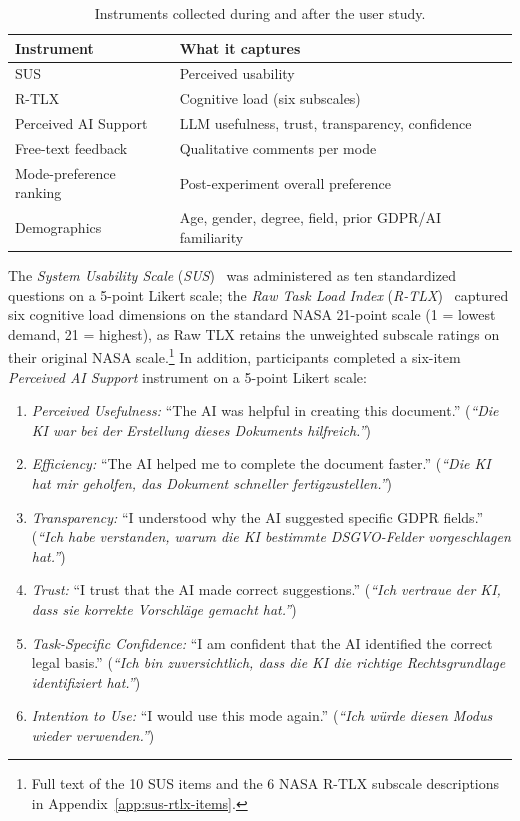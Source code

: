 \begin{table}[htbp]
\centering
\caption{Instruments collected during and after the user study.}
\label{tab:instruments-overview}
\begin{tabularx}{\linewidth}{@{}l X@{}}
\toprule
Instrument & What it captures \\
\midrule
SUS                       & Perceived usability \\
R-TLX                     & Cognitive load (six subscales) \\
Perceived AI Support      & LLM usefulness, trust, transparency, confidence \\
Free-text feedback        & Qualitative comments per mode \\
Mode-preference ranking   & Post-experiment overall preference \\
Demographics              & Age, gender, degree, field, prior GDPR/AI familiarity \\
\bottomrule
\end{tabularx}
\end{table}

The \textit{System Usability Scale} (\textit{SUS})~\cite{Brooke1996} was administered as ten standardized questions on a 5-point Likert scale; the \textit{Raw Task Load Index} (\textit{R-TLX})~\cite{Hart1988,Hart2006} captured six cognitive load dimensions on the standard NASA 21-point scale (1 = lowest demand, 21 = highest), as Raw TLX retains the unweighted subscale ratings on their original NASA scale.\footnote{Full text of the 10 SUS items and the 6 NASA R-TLX subscale descriptions in Appendix~\ref{app:sus-rtlx-items}.} In addition, participants completed a six-item \textit{Perceived AI Support} instrument on a 5-point Likert scale:

\begin{enumerate}
    \item \textit{Perceived Usefulness:} ``The AI was helpful in creating this document.'' (\textit{``Die KI war bei der Erstellung dieses Dokuments hilfreich.''})
    \item \textit{Efficiency:} ``The AI helped me to complete the document faster.'' (\textit{``Die KI hat mir geholfen, das Dokument schneller fertigzustellen.''})
    \item \textit{Transparency:} ``I understood why the AI suggested specific GDPR fields.'' (\textit{``Ich habe verstanden, warum die KI bestimmte DSGVO-Felder vorgeschlagen hat.''})
    \item \textit{Trust:} ``I trust that the AI made correct suggestions.'' (\textit{``Ich vertraue der KI, dass sie korrekte Vorschläge gemacht hat.''})
    \item \textit{Task-Specific Confidence:} ``I am confident that the AI identified the correct legal basis.'' (\textit{``Ich bin zuversichtlich, dass die KI die richtige Rechtsgrundlage identifiziert hat.''})
    \item \textit{Intention to Use:} ``I would use this mode again.'' (\textit{``Ich würde diesen Modus wieder verwenden.''})
\end{enumerate}

